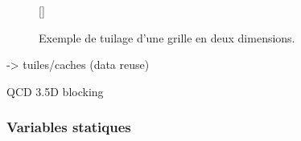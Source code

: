 \begin{figure}[!h]
[\FBwidth]
{\caption{Exemple de tuilage d'une grille en deux dimensions.}\label{fig:stencil_mtile}}
{}
\end{figure}


-> tuiles/caches (data reuse)

QCD \cite{Art1}
3.5D blocking \cite{Art11}



\subsubsection*{Variables statiques}


